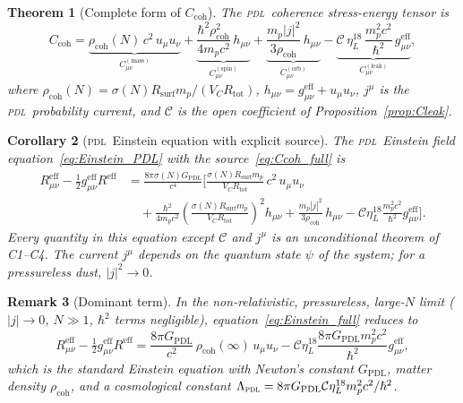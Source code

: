 \documentclass[12pt,a4paper]{article}
\newtheorem{theorem}{Theorem}[section]
\newtheorem{corollary}[theorem]{Corollary}
\newtheorem{remark}[theorem]{Remark}
\newcommand{\hb}{\hbar}
\newcommand{\PDL}{\textsc{pdl}}
\newcommand{\Ccoh}{C_{\mathrm{coh}}}
\newcommand{\Cmass}{C^{(\mathrm{mass})}}
\newcommand{\Cspin}{C^{(\mathrm{spin})}}
\newcommand{\Corb}{C^{(\mathrm{orb})}}
\newcommand{\Cleak}{C^{(\mathrm{leak})}}
\newcommand{\rhocoh}{\rho_{\mathrm{coh}}}
\newcommand{\sig}{\sigma}
\newcommand{\GPDL}{G_{\mathrm{PDL}}}
\newcommand{\geff}{g_{\mu\nu}^{\mathrm{eff}}}
\newcommand{\Rsurf}{R_{\mathrm{surf}}}
\newcommand{\Rtot}{R_{\mathrm{tot}}}
\newcommand{\VC}{V_C}
\newcommand{\etaL}{\eta_L}
\begin{document}
\begin{theorem}[Complete form of $\Ccoh$]
\label{thm:Ccoh_full}
The \PDL\ coherence stress-energy tensor is
\begin{equation}
\Ccoh = \underbrace{\rhocoh(N)\,c^2\,u_\mu u_\nu}_{\Cmass_{\mu\nu}} + \underbrace{\frac{\hb^2\rhocoh^2}{4m_p c^2}\,h_{\mu\nu}}_{\Cspin_{\mu\nu}} + \underbrace{\frac{m_p|j|^2}{3\rhocoh}\,h_{\mu\nu}}_{\Corb_{\mu\nu}} - \underbrace{\mathcal{C}\,\etaL^{18}\,\frac{m_p^2 c^2}{\hb^2}\,\geff}_{\Cleak_{\mu\nu}},
\label{eq:Ccoh_full}
\end{equation}
where $\rhocoh(N) = \sig(N)\Rsurf m_p/(\VC\Rtot)$, $h_{\mu\nu} = \geff + u_\mu u_\nu$, $j^\mu$ is the \PDL\ probability current, and $\mathcal{C}$ is the open coefficient of Proposition~\ref{prop:Cleak}.
\end{theorem}

\begin{corollary}[\PDL\ Einstein equation with explicit source]
\label{cor:Einstein_explicit}
The \PDL\ Einstein field equation~\eqref{eq:Einstein_PDL} with the source~\eqref{eq:Ccoh_full} is
\begin{align}
R_{\mu\nu}^{\mathrm{eff}} - \tfrac{1}{2}\geff R^{\mathrm{eff}} &= \frac{8\pi\sig(N)\GPDL}{c^4}\Biggl[\frac{\sig(N)\Rsurf m_p}{\VC\Rtot}\,c^2\,u_\mu u_\nu \nonumber\\
&\quad + \frac{\hb^2}{4m_p c^2}\left(\frac{\sig(N)\Rsurf m_p}{\VC\Rtot}\right)^2 h_{\mu\nu} + \frac{m_p|j|^2}{3\rhocoh}\,h_{\mu\nu} - \mathcal{C}\etaL^{18}\frac{m_p^2 c^2}{\hb^2}\geff\Biggr].
\label{eq:Einstein_full}
\end{align}
Every quantity in this equation except $\mathcal{C}$ and $j^\mu$ is an unconditional theorem of C1--C4. The current $j^\mu$ depends on the quantum state $\psi$ of the system; for a pressureless dust, $|j|^2\to 0$.
\end{corollary}

\begin{remark}[Dominant term]
In the non-relativistic, pressureless, large-$N$ limit ($|j|\to 0$, $N\gg 1$, $\hb^2$ terms negligible), equation~\eqref{eq:Einstein_full} reduces to
\begin{equation}
R_{\mu\nu}^{\mathrm{eff}} - \tfrac{1}{2}\geff R^{\mathrm{eff}} = \frac{8\pi\GPDL}{c^2}\,\rhocoh(\infty)\,u_\mu u_\nu - \mathcal{C}\etaL^{18}\frac{8\pi\GPDL m_p^2 c^2}{\hb^2}\geff,
\end{equation}
which is the standard Einstein equation with Newton's constant $G_{\mathrm{PDL}}$, matter density $\rhocoh$, and a cosmological constant $\Lambda_{\PDL} = 8\pi G_{\mathrm{PDL}}\mathcal{C}\etaL^{18}m_p^2 c^2/\hb^2$.
\end{remark}
\end{document}
